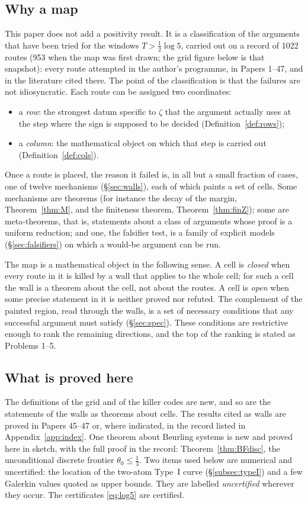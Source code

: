 \documentclass[11pt]{amsart}
\theoremstyle{definition}
\theoremstyle{remark}
\begin{document}
\subsection{Why a map}
This paper does not add a positivity result. It is a classification of the arguments that have been
tried for the windows $T>\frac12\log5$, carried out on a record of 1022 routes (953 when the map was first drawn; the grid figure below is that snapshot): every route attempted
in the author's programme, in Papers 1--47, and in the literature cited there. The point of the
classification is that the failures are not idiosyncratic. Each route can be assigned two coordinates:
\begin{itemize}
\item a \emph{row}: the strongest datum specific to $\zeta$ that the argument actually uses at the step
where the sign is supposed to be decided (Definition~\ref{def:rows});
\item a \emph{column}: the mathematical object on which that step is carried out
(Definition~\ref{def:cols}).
\end{itemize}
Once a route is placed, the reason it failed is, in all but a small fraction of cases, one of twelve
mechanisms (\S\ref{sec:walls}), each of which paints a set of cells. Some mechanisms are theorems
(for instance the decay of the margin, Theorem~\ref{thm:M}, and the finiteness theorem,
Theorem~\ref{thm:finZ}); some are meta-theorems, that is, statements about a class of arguments whose
proof is a uniform reduction; and one, the falsifier test, is a family of explicit models
(\S\ref{sec:falsifiers}) on which a would-be argument can be run.

The map is a mathematical object in the following sense. A cell is \emph{closed} when every route in it
is killed by a wall that applies to the whole cell; for such a cell the wall is a theorem about
the cell, not about the routes. A cell is \emph{open} when some precise statement in it is neither
proved nor refuted. The complement of the painted region, read through the walls, is a set of
necessary conditions that any successful argument must satisfy (\S\ref{sec:spec}). These conditions are
restrictive enough to rank the remaining directions, and the top of the ranking is stated as Problems
1--5.

\subsection{What is proved here}
The definitions of the grid and of the killer codes are new, and so are the statements of the walls as
theorems about cells. The results cited as walls are proved in Papers 45--47 or, where indicated, in
the record listed in Appendix~\ref{app:index}. One theorem about Beurling systems is new and proved here in
sketch, with the full proof in the record: Theorem~\ref{thm:BFdisc}, the unconditional discrete frontier $\theta_0\le\frac13$.
Two items used below are numerical and uncertified:
the location of the two-atom Type~I curve (\S\ref{subsec:typeI}) and a few Galerkin values quoted as
upper bounds. They are labelled \emph{uncertified} wherever they occur. The certificates
\eqref{eq:log5} are certified.
\end{document}
